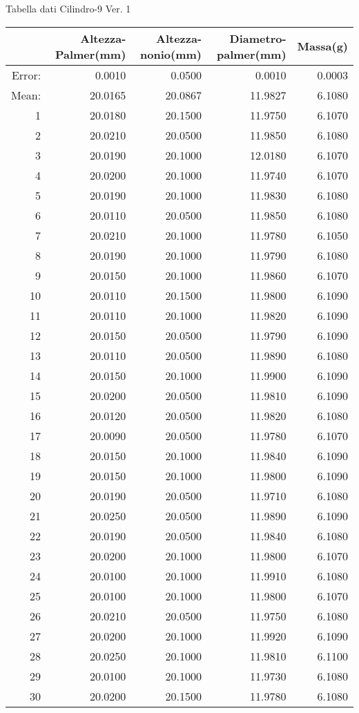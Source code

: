 \documentclass[11pt,a4paper,oneside,openany3] {report}
\begin{document}
Tabella dati Cilindro-9 Ver. 1
\begin{table}[ht]
\centering
\begin{tabular}{rrrrr}
  \hline
 & Altezza-Palmer(mm) & Altezza-nonio(mm) & Diametro-palmer(mm) & Massa(g) \\ 
  \hline
Error: & 0.0010 & 0.0500 & 0.0010 & 0.0003 \\ 
  Mean: & 20.0165 & 20.0867 & 11.9827 & 6.1080 \\ 
  1 & 20.0180 & 20.1500 & 11.9750 & 6.1070 \\ 
  2 & 20.0210 & 20.0500 & 11.9850 & 6.1080 \\ 
  3 & 20.0190 & 20.1000 & 12.0180 & 6.1070 \\ 
  4 & 20.0200 & 20.1000 & 11.9740 & 6.1070 \\ 
  5 & 20.0190 & 20.1000 & 11.9830 & 6.1080 \\ 
  6 & 20.0110 & 20.0500 & 11.9850 & 6.1080 \\ 
  7 & 20.0210 & 20.1000 & 11.9780 & 6.1050 \\ 
  8 & 20.0190 & 20.1000 & 11.9790 & 6.1080 \\ 
  9 & 20.0150 & 20.1000 & 11.9860 & 6.1070 \\ 
  10 & 20.0110 & 20.1500 & 11.9800 & 6.1090 \\ 
  11 & 20.0110 & 20.1000 & 11.9820 & 6.1090 \\ 
  12 & 20.0150 & 20.0500 & 11.9790 & 6.1090 \\ 
  13 & 20.0110 & 20.0500 & 11.9890 & 6.1080 \\ 
  14 & 20.0150 & 20.1000 & 11.9900 & 6.1090 \\ 
  15 & 20.0200 & 20.0500 & 11.9810 & 6.1090 \\ 
  16 & 20.0120 & 20.0500 & 11.9820 & 6.1080 \\ 
  17 & 20.0090 & 20.0500 & 11.9780 & 6.1070 \\ 
  18 & 20.0150 & 20.1000 & 11.9840 & 6.1090 \\ 
  19 & 20.0150 & 20.1000 & 11.9800 & 6.1090 \\ 
  20 & 20.0190 & 20.0500 & 11.9710 & 6.1080 \\ 
  21 & 20.0250 & 20.0500 & 11.9890 & 6.1090 \\ 
  22 & 20.0190 & 20.0500 & 11.9840 & 6.1080 \\ 
  23 & 20.0200 & 20.1000 & 11.9800 & 6.1070 \\ 
  24 & 20.0100 & 20.1000 & 11.9910 & 6.1080 \\ 
  25 & 20.0100 & 20.1000 & 11.9800 & 6.1070 \\ 
  26 & 20.0210 & 20.0500 & 11.9750 & 6.1080 \\ 
  27 & 20.0200 & 20.1000 & 11.9920 & 6.1090 \\ 
  28 & 20.0250 & 20.1000 & 11.9810 & 6.1100 \\ 
  29 & 20.0100 & 20.1000 & 11.9730 & 6.1080 \\ 
  30 & 20.0200 & 20.1500 & 11.9780 & 6.1080 \\ 
   \hline
\end{tabular}
\end{table}
\end{document}
